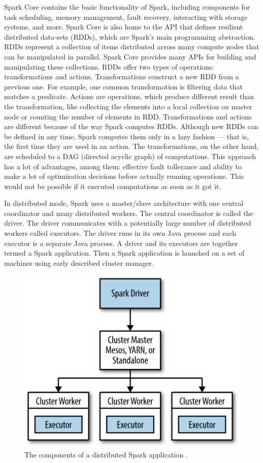 Spark Core contains the basic functionality of Spark, including components for task scheduling, memory management, fault recovery, interacting with storage systems, and more. Spark Core is also home to the API that defines resilient distributed data‐sets (RDDs), which are Spark’s main programming abstraction. RDDs represent a collection of items distributed across many compute nodes that can be manipulated in parallel. Spark Core provides many APIs for building and manipulating these collections. RDDs offer two types of operations: transformations and actions. Transformations construct a new RDD from a previous one. For example, one common transformation is filtering data that matches a predicate. Actions are operations, which produce different result than the transformation, like collecting the elements into a local collection on master node or counting the number of elements in RDD. Transformations and actions are different because of the way Spark computes RDDs. Although new RDDs can be defined in any time, Spark computes them only in a lazy fashion — that is, the first time they are used in an action. The transformations, on the other hand, are scheduled to a DAG (directed acyclic graph) of computations. This approach has a lot of advantages, among them: effective fault tollerance and ability to make a lot of optimization decisions before actually running operations. This would not be possible if it executed computations as soon as it got it.

In distributed mode, Spark uses a master/slave architecture with one central coordinator and many distributed workers. The central coordinator is called the driver. The driver communicates with a potentially large number of distributed workers called executors. The driver runs in its own Java process and each executor is a separate Java process. A driver and its executors are together termed a Spark application. Then a Spark application is launched on a set of machines using early described cluster manager.

\begin{figure}
\centering\includegraphics[width=.6\textwidth]{img/spark-runtime-split}
\caption{ The components of a distributed Spark application \cite{learning_spark}.}  \label{img:spark-components}
\end{figure}

